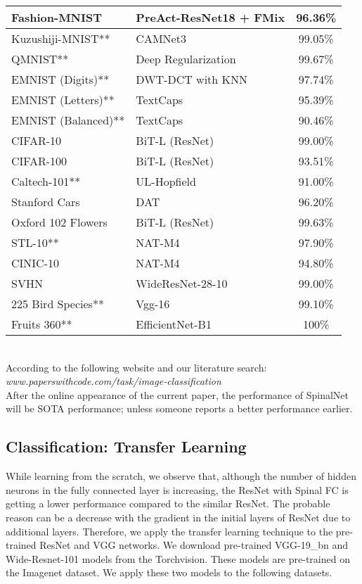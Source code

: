 \documentclass[journal]{IEEEtran}
\begin{document}
\begin{table}
\begin{tabular}{|l|l|c|}
 Fashion-MNIST&PreAct-ResNet18 + FMix  \cite{harris2020understanding} & 96.36\%   \\ \hline 
 Kuzushiji-MNIST**&	CAMNet3 \cite{tissera2019context}   & 99.05\%    \\ \hline 
 QMNIST**&Deep Regularization  \cite{yoo2020deep} & 99.67\%    \\ \hline 
 EMNIST (Digits)** & DWT-DCT with KNN  \cite{ghadekar2018handwritten} & 97.74\%    \\ \hline 
 EMNIST (Letters)**& TextCaps  \cite{jayasundara2019textcaps} & 95.39\%    \\ \hline 
 EMNIST (Balanced)**& TextCaps  \cite{jayasundara2019textcaps} & 90.46\%    \\ \hline 
 CIFAR-10& 	BiT-L (ResNet) \cite{kolesnikov2019large}  & 99.00\%  \\ \hline 
  CIFAR-100& BiT-L (ResNet) \cite{kolesnikov2019large} & 93.51\%  \\ \hline 
  Caltech-101**& UL-Hopfield \cite{liu2018unsupervised} & 91.00\%  \\ \hline 
  Stanford Cars& DAT \cite{Ngiam2018unsupervised} & 96.20\%  \\ \hline 
  Oxford 102 Flowers& BiT-L (ResNet) \cite{kolesnikov2019large} & 99.63\%  \\ \hline
  STL-10** & NAT-M4 \cite{Lu2020neural} & 97.90\% \\ \hline
  CINIC-10 & NAT-M4 \cite{Lu2020neural} & 94.80\% \\ \hline
  SVHN & WideResNet-28-10 \cite{Cubuk2019randaugment}  & 99.00\% \\ \hline
  225 Bird Species** & Vgg-16 \cite{bird_vgg16} & 99.10\% \\ \hline
  Fruits 360** & EfficientNet-B1  \cite{duong2020automated} & 100\% \\ \hline
\end{tabular}
\\  According to the following website and our literature search:  \emph{www.paperswithcode.com/task/image-classification}  \\  
 After the online appearance of the current paper, the performance of SpinalNet will be SOTA performance; unless someone reports a better performance earlier.

\end{table}



\subsection{Classification: Transfer Learning}
While learning from the scratch, we observe that, although the number of hidden neurons in the fully connected layer is increasing, the ResNet with Spinal FC is getting a lower performance compared to the similar ResNet. The probable reason can be a decrease with the gradient in the initial layers of ResNet due to additional layers. Therefore, we apply the transfer learning technique to the pre-trained ResNet and VGG networks. We download pre-trained VGG-19\_bn and Wide-Resnet-101 models from the Torchvision. These models are pre-trained on the Imagenet dataset. We apply these two models to the following datasets.
\end{document}
